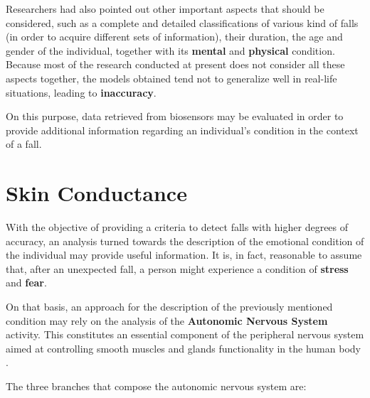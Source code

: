 
Researchers had also pointed out other important aspects that should be considered, such as a complete and detailed classifications of various kind of falls (in order to acquire different sets of information), their duration, the age and gender of the individual, together with its \textbf{mental} and \textbf{physical} condition.
Because most of the research conducted at present does not consider all these aspects together, the models obtained tend not to generalize well in real-life situations, leading to \textbf{inaccuracy}.

On this purpose, data retrieved from biosensors may be evaluated in order to provide additional information regarding an individual's condition in the context of a fall.

\section{Skin Conductance}\label{sec:edaintro}

With the objective of providing a criteria to detect falls with higher degrees of accuracy, an analysis turned towards the description of the emotional condition of the individual may provide useful information. It is, in fact, reasonable to assume that, after an unexpected fall, a person might experience a condition of \textbf{stress} and \textbf{fear}.

On that basis, an approach for the description of the previously mentioned condition may rely on the analysis of the \textbf{Autonomic Nervous System} activity. This constitutes an essential component of the peripheral nervous system aimed at controlling smooth muscles and glands functionality in the human body \cite{ansWiki}.

The three branches that compose the autonomic nervous system are:

